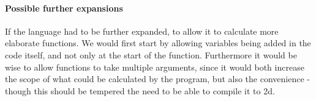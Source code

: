 \paragraph{Possible further expansions}
If the language had to be further expanded, to allow it to calculate
more elaborate functions. We would first start by allowing variables
being added in the code itself, and not only at the start of the
function. Furthermore it would be wise to allow functions to take
multiple arguments, since it would both increase the scope of what
could be calculated by the program, but also the convenience - though
this should be tempered the need to be able to compile it to
2d.

